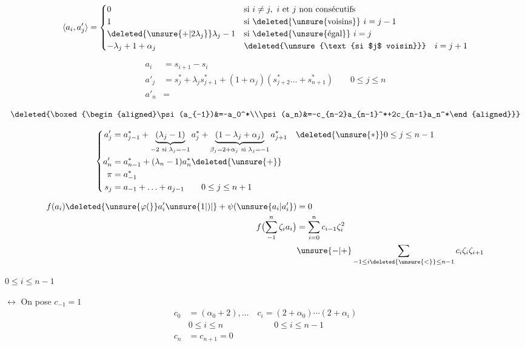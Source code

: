 \[
\langle a_i,a'_j\rangle=
\begin{cases}
0&\text{si } i\ne j,\ i\text{ et }j\text{ non consécutifs}\\
1&\text{si \deleted{\unsure{voisins}} }i=j-1\\
\deleted{\unsure{+|2\lambda_j}}\lambda_j-1&\text{si \deleted{\unsure{égal}} }i=j\\
-\lambda_j+1+\alpha_j&\deleted{\unsure{\text{si $j$ voisin}}}\quad i=j+1
\end{cases}
\]

\[
\begin{aligned}
a_i&=s_{i+1}-s_i\\
a'_j&=s_j^*+\lambda_j s_{j+1}^*+(1+\alpha_j)(s_{j+2}^* \ldots+s_{n+1}^*)\qquad 0\le j\le n\\
a'_n&=
\end{aligned}
\]

\[
\deleted{\boxed{\begin{aligned}\psi(a_{-1})&=-a_0^*\\\psi(a_n)&=-c_{n-2}a_{n-1}^*+2c_{n-1}a_n^*\end{aligned}}}
\]

\[
\left\{\begin{aligned}
a'_j&=a_{j-1}^*+\underbrace{(\lambda_j-1)}_{-2\ \text{si }\lambda_j=-1}a_j^*+
\underbrace{(1-\lambda_j+\alpha_j)}_{\beta_j=2+\alpha_j\ \text{si }\lambda_j=-1}a_{j+1}^*
\quad\deleted{\unsure{*}}0\le j\le n-1\\
a'_n&=a_{n-1}^*+(\lambda_n-1)a_n^*\deleted{\unsure{+}}\\
\pi&=a_{-1}^*\\
s_j&=a_{-1}+\ldots+a_{j-1}\qquad0\le j\le n+1
\end{aligned}\right.
\]

\[
\begin{aligned}
f(a_i)\deleted{\unsure{\varphi(}}a'_i\unsure{1|)|{}}+\psi(\unsure{a_i|a'_i})&=0\\
f\bigl(\sum_{-1}^{n}\zeta_i a_i\bigr)&=\sum_{i=0}^{n}c_{i-1}\zeta_i^2\\
&\unsure{-|+}\sum_{-1\le i\deleted{\unsure{<}}\le n-1}c_i\zeta_i\zeta_{i+1}
\end{aligned}
\]

 \quad $0\le i\le n-1$

$\longleftrightarrow$ On pose  $c_{-1}=1$
\[
\begin{aligned}
c_0&=(\alpha_0+2),\ldots\quad c_i=(2+\alpha_0)\cdots(2+\alpha_i)\\
&0\le i\le n\hspace{6em}0\le i\le n-1\\
c_n&=c_{n+1}=0
\end{aligned}
\]

